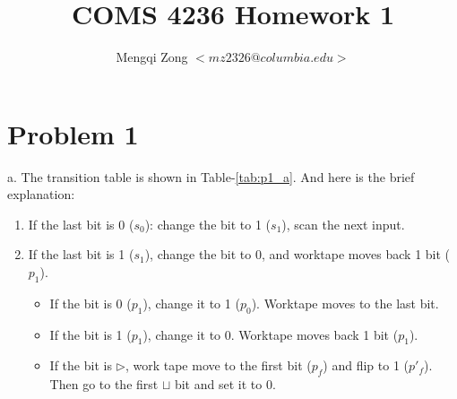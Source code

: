 \documentclass[12pt]{article}
\title{COMS 4236 Homework 1}
\author{Mengqi Zong $<mz2326@columbia.edu>$}
\begin{document}
\maketitle

\setlength{\parindent}{0in}

\section*{Problem 1}


a. The transition table is shown in Table-\ref{tab:p1_a}. And here is
the brief explanation:

\begin{enumerate}
\item If the last bit is 0 ($s_0$): change the bit to 1 ($s_1$),
  scan the next input.
\item If the last bit is 1 ($s_1$), change the bit to 0, and
  worktape moves back 1 bit ($p_1$).
  \begin{itemize}
  \item If the bit is 0 ($p_1$), change it to 1 ($p_0$). Worktape
    moves to the last bit.
  \item If the bit is 1 ($p_1$), change it to 0. Worktape moves back
    1 bit ($p_1$).
  \item If the bit is $\triangleright$, work tape move to the first
    bit ($p_f$) and flip to 1 ($p'_f$). Then go to the first $\sqcup$
    bit and set it to 0.
  \end{itemize}
\end{enumerate}
\end{document}
